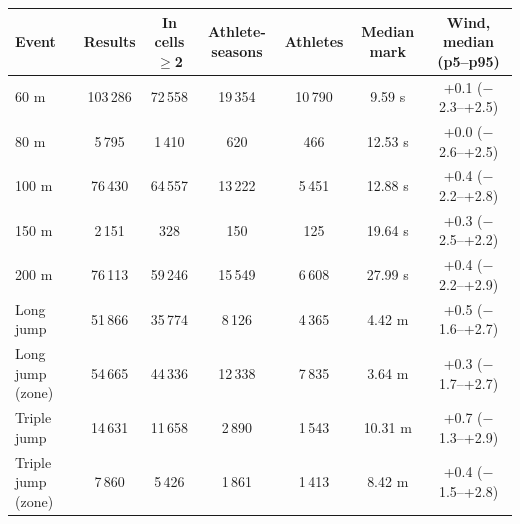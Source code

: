 \begin{tabular}{lcccccc}
\toprule
Event & Results & In cells $\geq$2 & Athlete-seasons & Athletes & Median mark & Wind, median (p5--p95) \\
\midrule
60 m & 103\,286 & 72\,558 & 19\,354 & 10\,790 & 9.59 s & +0.1 ($-$2.3--+2.5) \\
80 m & 5\,795 & 1\,410 & 620 & 466 & 12.53 s & +0.0 ($-$2.6--+2.5) \\
100 m & 76\,430 & 64\,557 & 13\,222 & 5\,451 & 12.88 s & +0.4 ($-$2.2--+2.8) \\
150 m & 2\,151 & 328 & 150 & 125 & 19.64 s & +0.3 ($-$2.5--+2.2) \\
200 m & 76\,113 & 59\,246 & 15\,549 & 6\,608 & 27.99 s & +0.4 ($-$2.2--+2.9) \\
Long jump & 51\,866 & 35\,774 & 8\,126 & 4\,365 & 4.42 m & +0.5 ($-$1.6--+2.7) \\
Long jump (zone) & 54\,665 & 44\,336 & 12\,338 & 7\,835 & 3.64 m & +0.3 ($-$1.7--+2.7) \\
Triple jump & 14\,631 & 11\,658 & 2\,890 & 1\,543 & 10.31 m & +0.7 ($-$1.3--+2.9) \\
Triple jump (zone) & 7\,860 & 5\,426 & 1\,861 & 1\,413 & 8.42 m & +0.4 ($-$1.5--+2.8) \\
\bottomrule
\end{tabular}
